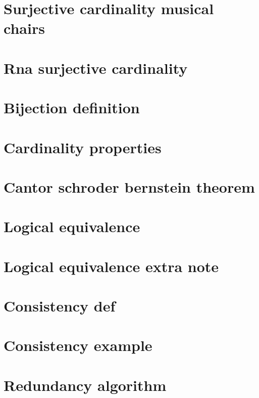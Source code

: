 \section*{Surjective cardinality musical chairs}

\vfill
\section*{Rna surjective cardinality}

\vfill
\section*{Bijection definition}

\vfill
\section*{Cardinality properties}

\vfill
\section*{Cantor schroder bernstein theorem}

\vfill
\section*{Logical equivalence}

\vfill
\section*{Logical equivalence extra note}

\vfill
\section*{Consistency def}

\vfill
\section*{Consistency example}

\vfill
\section*{Redundancy algorithm}

\vfill
